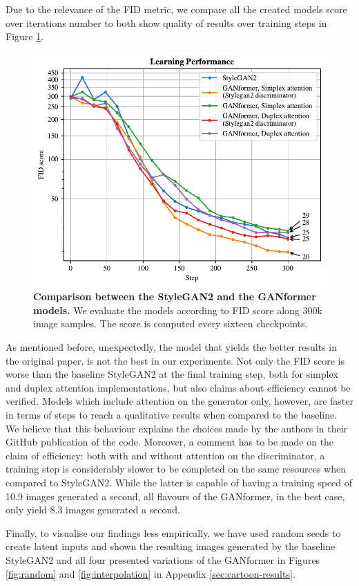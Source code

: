 \documentclass{article}
\begin{document}
Due to the relevance of the FID metric, we compare all the created models score over iterations 
number to both show quality of results over training steps in Figure \ref{fig:performance}.
\begin{figure}[htpb]				
	\centering
	\includegraphics[width=.7\linewidth]{FIDscore-cartoonset.pdf}
	\caption{\textbf{Comparison between the StyleGAN2 and the GANformer models.} We evaluate 
		the models according to FID score along 300k image samples. The score is computed every 
		sixteen checkpoints.}
	\label{fig:performance}
\end{figure}

As mentioned before, unexpectedly, the model that yields the better results in the original paper, is 
not the best in our experiments.
Not only the FID score is worse than the baseline StyleGAN2 at the final training step, both for 
simplex and duplex attention implementations, but also claims about efficiency cannot be verified.
Models which include attention on the generator only, however, are faster in terms of steps to reach a qualitative results when compared to the baseline.
We believe that this behaviour explains the choices made by the authors in their GitHub publication 
of the code.
Moreover, a comment has to be made on the claim of efficiency: both with and without attention on 
the discriminator, a training step is considerably slower to be completed on the same resources 
when compared to StyleGAN2.
While the latter is capable of having a training speed of 10.9 images generated a second, all flavours 
of the GANformer, in the best case, only yield 8.3 images generated a second.

Finally, to visualise our findings less empirically, we have used random seeds to create latent inputs and shown the resulting images generated by the baseline StyleGAN2 and all four presented variations of the GANformer in Figures \ref{fig:random} and \ref{fig:interpolation} in Appendix \ref{sec:cartoon-results}.
\end{document}
